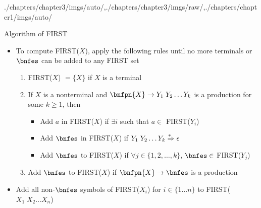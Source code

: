 \begin{graphicspathcontext}{{./chapters/chapter3/imgs/auto/},{./chapters/chapter3/imgs/raw/},{./chapters/chapter1/imgs/auto/}}
\begin{bibunit}[apalike]
\begin{frame}[background=8]{Algorithm of FIRST}
	\begin{itemize}
	\item To compute FIRST($X$), apply the following rules until no more terminals or $\bnfes$ can be added to any FIRST set
	\vfill
		\begin{enumerate}
		\item FIRST($X$) $= \{ X \}$ if $X$ is a terminal
		\item If $X$ is a nonterminal and $\bnfpn{X} \bnfopo Y_1 \; Y_2 \dots Y_k$ is a production for some $k \ge 1$, then 
			\begin{itemize}
				\item Add $a$ in FIRST($X$) if $\exists i$ such that $a \in$ FIRST($Y_i$) 
				\item Add $\bnfes$ in FIRST($X$) if $Y_1\;Y_2 \dots Y_k \overset{*\hspace{.4em}}{\Rightarrow} \epsilon$
				\item Add $\bnfes$ to FIRST($X$) if $\forall j \in \{1, 2, \dots, k\}$, $\bnfes \in$ FIRST($Y_j$)
			\end{itemize}
		\item Add $\bnfes$ to FIRST($X$) if $\bnfpn{X} \bnfopo \bnfes$ is a production
		\end{enumerate}
	\vfill
	\item Add all non-$\bnfes$ symbols of FIRST($X_i$) for $i \in \{1 \dots n\}$ to FIRST($X_1\;X_2 \dots X_n$) 
	\end{itemize}
\end{frame}


\end{bibunit}
\end{graphicspathcontext}

